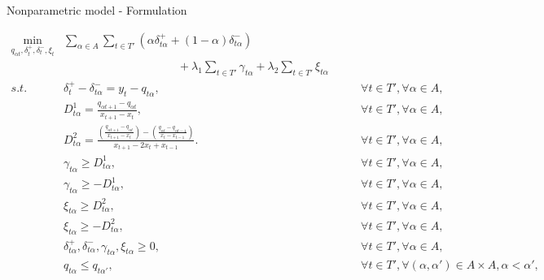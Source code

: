 \documentclass[ignorenonframetext,]{beamer}
\begin{document}
\begin{frame}{Nonparametric model - Formulation}

\tiny

\begin{eqnarray}
\min_{q_{\alpha t},\delta^+_{t}, \delta_t^-, \xi_t} & \sum_{\alpha \in A} \sum_{t \in T'}\left(\alpha\delta_{t \alpha }^{+}+(1-\alpha)\delta_{t \alpha }^{-}\right) & \\
& \qquad \qquad \qquad \qquad \qquad + \lambda_1\sum_{t \in T'}\gamma_{t \alpha } + \lambda_2\sum_{t \in T'}\xi_{t \alpha } & \nonumber \\
s.t. & \delta_{t}^{+}-\delta_{t \alpha }^{-}=y_{t}-q_{t \alpha }, & \qquad\forall t \in T',\forall \alpha \in A,\\
   & D^{1}_{t \alpha }=\frac{q_{\alpha t+1}-q_{\alpha t}}{x_{t+1}-x_{t}},
    & \qquad\forall t \in T',\forall \alpha \in A,\\   
 & D^{2}_{t \alpha }=\frac{\left(\frac{q_{\alpha t+1}-q_{\alpha t}}{x_{t+1}-x_{t}}\right)-\left(\frac{q_{\alpha t}-q_{\alpha t-1}}{x_{t}-x_{t-1}}\right)}{x_{t+1}-2x_{t} + x_{t-1}}.
  & \qquad\forall t \in T',\forall \alpha \in A,\\
 & \gamma_{t \alpha}\geq D^1_{t \alpha }, & \qquad\forall t \in T',\forall \alpha \in A,\\
  & \gamma_{t \alpha}\geq-D^1_{t \alpha}, & \qquad\forall t \in T',\forall \alpha \in A,\\
  & \xi_{t \alpha}\geq D^2_{t \alpha }, & \qquad\forall t \in T',\forall \alpha \in A,\\
 & \xi_{t \alpha}\geq-D^2_{t \alpha}, & \qquad\forall t \in T',\forall \alpha \in A,\\
 & \delta_{t \alpha}^{+},\delta_{t \alpha}^{-},\gamma_{t \alpha}, \xi_{t \alpha}\geq0, & \qquad\forall t \in T',\forall \alpha \in A,\\
  & q_{t \alpha} \leq q_{t \alpha'}, & \qquad \forall t \in T', \forall (\alpha, \alpha') \in A \times A, \alpha < \alpha',\nonumber \\  
  \end{eqnarray}

\end{frame}
\end{document}
